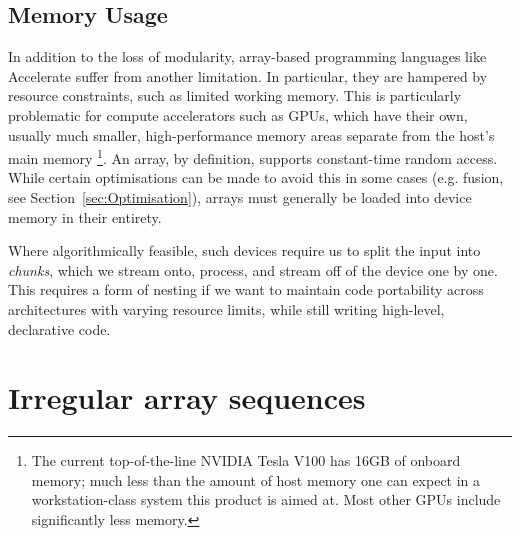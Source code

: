 

%
%
%

\subsection{Memory Usage}
\label{sec:problem_2}

In addition to the loss of modularity, array-based programming languages like Accelerate suffer from another limitation. In particular, they are hampered by resource constraints, such as limited working memory. This is particularly problematic for compute accelerators such as GPUs, which have their own, usually much smaller, high-performance memory areas separate from the host's main memory%
\footnote{The current top-of-the-line NVIDIA Tesla V100 has 16GB of onboard
memory; much less than the amount of host memory one can expect in a
workstation-class system this product is aimed at. Most other GPUs include significantly less memory.}.
An array, by definition, supports constant-time random access. While certain optimisations can be made to avoid this in some cases (e.g. fusion, see Section~\ref{sec:Optimisation}), arrays must generally be loaded into device memory in their entirety.

Where algorithmically feasible, such devices require us to split the input into \emph{chunks}, which we stream onto, process, and stream off of the device one by one. This requires a form of nesting if we want to maintain code portability across architectures with varying resource limits, while still writing high-level, declarative code.

\section{Irregular array sequences}
\label{sec:sequences}

